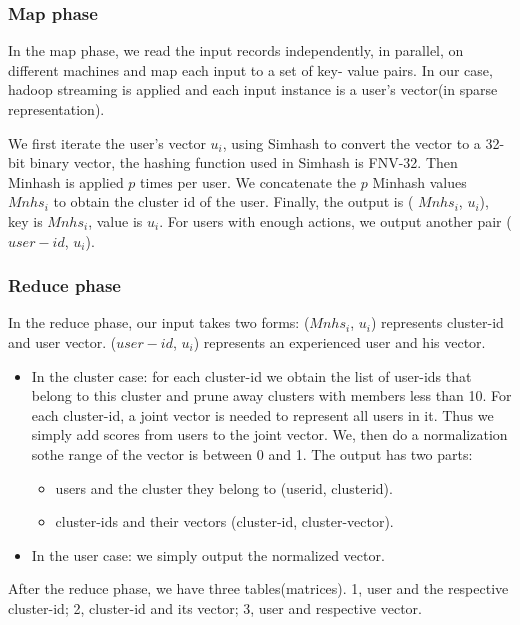 \subsubsection{Map phase}
In the map phase, we read the input records independently, in parallel, on different machines and map each input to a set of key-
value pairs. In our case, hadoop streaming is applied and each input instance is a user's vector(in sparse representation).

We first iterate the user's vector $u_i$, using Simhash to convert the vector to a 32-bit binary vector, the hashing function used in Simhash is FNV-32. Then Minhash is applied $p$ times per user. We concatenate the $p$ Minhash values $Mnhs_i$ to obtain the cluster id of the user. Finally, the output is ( $Mnhs_i$, $u_i$), key is $Mnhs_i$, value is $u_i$. For users with enough actions, we output another pair ( $user-id$, $u_i$). 

\subsubsection{Reduce phase}

In the reduce phase, our input takes two forms: ($Mnhs_i$, $u_i$) represents cluster-id and user vector. ($user-id$, $u_i$) represents an experienced user and his vector.
\begin{itemize}
\item In the cluster case: for each cluster-id we obtain the list of user-ids that belong to this cluster and prune away clusters with members less than 10. For each cluster-id, a joint vector is needed to represent all users in it. Thus we simply add scores from users to the joint vector. We, then do a normalization sothe range of the vector is between 0 and 1. The output has two parts: 
\begin{itemize}
\item users and the cluster they belong to (userid, clusterid). 
\item cluster-ids and their vectors (cluster-id, cluster-vector).
\end{itemize}
\item In the user case: we simply output the normalized vector.

\end{itemize}

After the reduce phase, we have three tables(matrices). 1, user and the respective cluster-id; 2, cluster-id and its vector; 3, user and respective vector.

